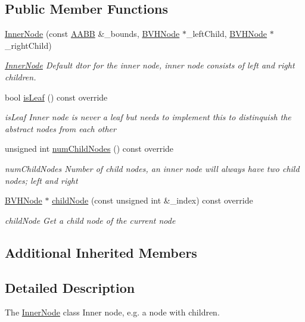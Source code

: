 \subsection*{Public Member Functions}
\begin{DoxyCompactItemize}
\item 
\hyperlink{classInnerNode_a7ebac6f83b9cc6235b257fdae8e93552}{Inner\-Node} (const \hyperlink{classAABB}{A\-A\-B\-B} \&\-\_\-bounds, \hyperlink{classBVHNode}{B\-V\-H\-Node} $\ast$\-\_\-left\-Child, \hyperlink{classBVHNode}{B\-V\-H\-Node} $\ast$\-\_\-right\-Child)
\begin{DoxyCompactList}\small\item\em \hyperlink{classInnerNode}{Inner\-Node} Default dtor for the inner node, inner node consists of left and right children. \end{DoxyCompactList}\item 
bool \hyperlink{classInnerNode_a9132770448acf40a331114a350dbe249}{is\-Leaf} () const override
\begin{DoxyCompactList}\small\item\em is\-Leaf Inner node is never a leaf but needs to implement this to distinquish the abstract nodes from each other \end{DoxyCompactList}\item 
unsigned int \hyperlink{classInnerNode_a685a9782d88772dfd2ac367025b65848}{num\-Child\-Nodes} () const override
\begin{DoxyCompactList}\small\item\em num\-Child\-Nodes Number of child nodes, an inner node will always have two child nodes; left and right \end{DoxyCompactList}\item 
\hyperlink{classBVHNode}{B\-V\-H\-Node} $\ast$ \hyperlink{classInnerNode_af4d76a6913d55b395b30f2ce244b882d}{child\-Node} (const unsigned int \&\-\_\-index) const override
\begin{DoxyCompactList}\small\item\em child\-Node Get a child node of the current node \end{DoxyCompactList}\end{DoxyCompactItemize}
\subsection*{Additional Inherited Members}


\subsection{Detailed Description}
The \hyperlink{classInnerNode}{Inner\-Node} class Inner node, e.\-g. a node with children. 

